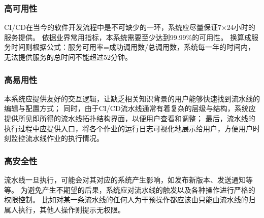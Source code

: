 \subsubsection{高可用性}
CI/CD在当今的软件开发流程中是不可缺少的一环，系统应尽量保证7×24小时的服务提供。
依据业界常用指标，本系统需要至少达到99.99\%的可用性。
换算成服务时间则根据公式：服务可用率=成功调用数/总调用数，系统每一年的时间内，无法提供服务的总时间不能超过52分钟。

\subsubsection{高易用性}
本系统应提供友好的交互逻辑，让缺乏相关知识背景的用户能够快速找到流水线的编辑与配置方式；
同时，由于CI/CD流水线通常有着复杂的层级与结构，系统应提供所见即所得的流水线拓扑结构界面，以便用户查看和调整；
最后，流水线的执行过程中应提供入口，将各个作业的运行日志可视化地展示给用户，方便用户时刻监控流水线作业的执行情况。

\subsubsection{高安全性}
流水线一旦执行，可能会对其对应的系统产生影响，如发布新版本、发送通知等等。
为避免产生不期望的后果，系统应对流水线的触发以及各种操作进行严格的权限控制。
比如对某一条流水线的任何人为干预操作都应该由只能由流水线的归属人执行，其他人操作则提示无权限。
